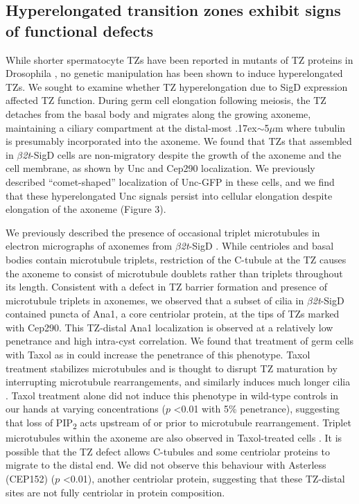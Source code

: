 \documentclass[12pt, twoside, letterpaper]{article}
\newcommand{\PIP}{PIP\textsubscript{2}}
\newcommand{\sigd}{$\beta$\textit{2t}-SigD}
\begin{document}
\begin{doublespacing}
\begin{linenumbers}
    \subsection{Hyperelongated transition zones exhibit signs of functional defects}
    While shorter spermatocyte TZs have been reported in mutants of TZ proteins in Drosophila
    \citep{vieillard2016transition, pratt2016drosophila},
    no genetic manipulation has been shown to induce hyperelongated TZs.
    We sought to examine whether TZ hyperelongation due to SigD expression
    affected TZ function.
    During germ cell elongation following meiosis, the TZ detaches from
    the basal body and migrates along the growing axoneme, maintaining a ciliary compartment
    at the distal-most {\raise.17ex\hbox{$\scriptstyle\sim$}}5$\mu$m where tubulin
    is presumably incorporated into the axoneme.
    We found that
    TZs that assembled in \sigd{} cells are non-migratory despite the growth of the
    axoneme and the cell membrane, as shown by Unc and Cep290 localization.
    We previously described ``comet-shaped'' localization of Unc-GFP in these cells,
    and we find that these hyperelongated Unc signals persist into cellular elongation
    despite elongation of the axoneme (Figure 3).

    We previously described the presence of occasional triplet microtubules
    in electron micrographs of axonemes from \sigd{} \citep{wei2008depletion}.
    While centrioles and basal bodies contain microtubule triplets,
    restriction of the C-tubule at the TZ causes the axoneme to
    consist of microtubule doublets rather than triplets throughout its length.
    Consistent with a defect in TZ barrier formation and presence of
    microtubule triplets in axonemes,
    we observed that a subset of cilia in \sigd{}
    contained puncta of Ana1, a core centriolar protein, at the tips
    of TZs marked with Cep290.
    This TZ-distal Ana1 localization is observed at a relatively low penetrance
    and high intra-cyst correlation.
    We found that treatment of germ cells with Taxol as in \citep{riparbelli2013unique}
    could increase the penetrance of this phenotype.
    Taxol treatment stabilizes microtubules and is thought to disrupt TZ maturation
    by interrupting microtubule rearrangements, and similarly induces much longer cilia
    \citep{riparbelli2012assembly}.
    Taxol treatment alone did not induce this phenotype in wild-type controls in our hands
    at varying concentrations ($p$ <0.01 with 5\% penetrance),
    suggesting that loss of \PIP{} acts upstream of or prior to microtubule rearrangement.
    Triplet microtubules within the axoneme are also observed in Taxol-treated cells \citep{riparbelli2013unique}.
    It is possible that the TZ defect allows C-tubules and some centriolar proteins
    to migrate to the distal end.
    We did not observe this behaviour with Asterless (CEP152)
    \citep{dzhindzhev2010asterless, blachon2008drosophila} ($p$ <0.01),
    another centriolar protein, suggesting that these TZ-distal
    sites are not fully centriolar in protein composition.


\end{linenumbers}
\end{doublespacing}
\end{document}
